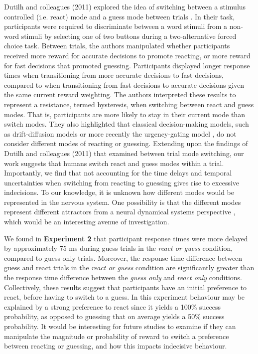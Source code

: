 \documentclass[12pt]{article}
\newcommand\boldblue[1]{\textcolor{mydarkblue}{\textbf{#1}}}
\begin{document}
Dutilh and colleagues (2011) explored the idea of switching between a stimulus controlled (i.e. react) mode and a guess mode between trials \autocite{dutilhPhaseTransitionModel2011}. In their task, participants were required to discriminate between a word stimuli from a non-word stimuli by selecting one of two buttons during a two-alternative forced choice task. Between trials, the authors manipulated whether participants received more reward for accurate decisions to promote reacting, or more reward for fast decisions that promoted guessing. Participants displayed longer response times when transitioning from more accurate decisions to fast decisions, compared to when transitioning from fast decisions to accurate decisions given the same current reward weighting. The authors interpreted these results to represent a resistance, termed hysteresis, when switching between react and guess modes. That is, participants are more likely to stay in their current mode than switch modes. They also highlighted that classical decision-making models, such as drift-diffusion models \autocite{ratcliffModeling2alternativeForcedchoice2018} or more recently the urgency-gating model \autocite*{cisekDecisionsChangingConditions2009,derosiereTradingAccuracySpeed2021,thuraDecisionMakingUrgency2012}, do not consider different modes of reacting or guessing. Extending upon the findings of Dutilh and colleagues (2011) that examined between trial mode switching, our work suggests that humans switch react and guess modes within a trial. Importantly, we find that not accounting for the time delays and temporal uncertainties when switching from reacting to guessing gives rise to excessive indecisions. To our knowledge, it is unknown how different modes would be represented in the nervous system. One possibility is that the different modes represent different attractors from a neural dynamical systems perspective \autocite*{erlhagenDynamicFieldTheory2002,wangDecisionMakingRecurrent2008,churchlandNeuralPopulationDynamics2012,shenoyCorticalControlArm2013}, which would be an interesting avenue of investigation.

We found in \boldblue{Experiment 2} that participant response times were more delayed by approximately 75 ms during guess trials in the \emph{react or guess} condition, compared to guess only trials. Moreover, the response time difference between guess and react trials in the \emph{react or guess} condition are significantly greater than the response time difference between the \emph{guess only} and \emph{react only} conditions. Collectively, these results suggest that participants have an initial preference to react, before having to switch to a guess. In this experiment behaviour may be explained by a strong preference to react since it yields a 100\% success probability, as opposed to guessing that on average yields a 50\% success probability. It would be interesting for future studies to examine if they can manipulate the magnitude or probability of reward to switch a preference between reacting or guessing, and how this impacts indecisive behaviour.
\end{document}
